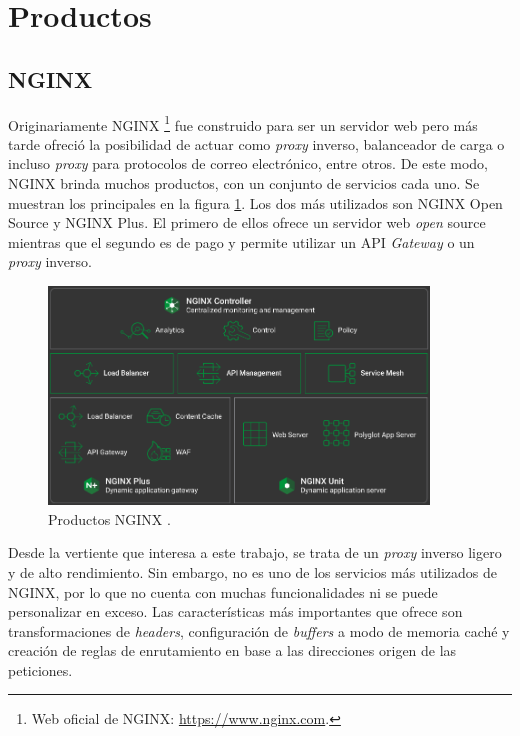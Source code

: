 \documentclass[11pt,spanish,listoffigures]{tfgetsinf}
\begin{document}
	\section{Productos}


		\subsection{NGINX}

Originariamente NGINX \footnote{Web oficial de NGINX: \url{https://www.nginx.com}.} fue construido para ser un servidor web pero más tarde ofreció la posibilidad de actuar como \emph{proxy} inverso, balanceador de carga o incluso \emph{proxy} para protocolos de correo electrónico, entre otros. De este modo, NGINX brinda muchos productos, con un conjunto de servicios cada uno. Se muestran los principales en la figura \ref{productosNGINX}. Los dos más utilizados son NGINX Open Source y NGINX Plus. El primero de ellos ofrece un servidor web \emph{open} source mientras que el segundo es de pago y permite utilizar un API \emph{Gateway} o un \emph{proxy} inverso.

\begin{figure}[ht]
\centering
\includegraphics[width=0.9\textwidth]{imagenes/productosNGINX}
\caption[Productos NGINX.]{Productos NGINX \cite{NGINX}.}
	\label{productosNGINX}
\end{figure}

Desde la vertiente que interesa a este trabajo, se trata de un \emph{proxy} inverso ligero y de alto rendimiento. Sin embargo, no es uno de los servicios más utilizados de NGINX, por lo que no cuenta con muchas funcionalidades ni se puede personalizar en exceso. Las características más importantes que ofrece son transformaciones de \emph{headers}, configuración de \emph{buffers} a modo de memoria caché y creación de reglas de enrutamiento en base a las direcciones origen de las peticiones.
\end{document}
